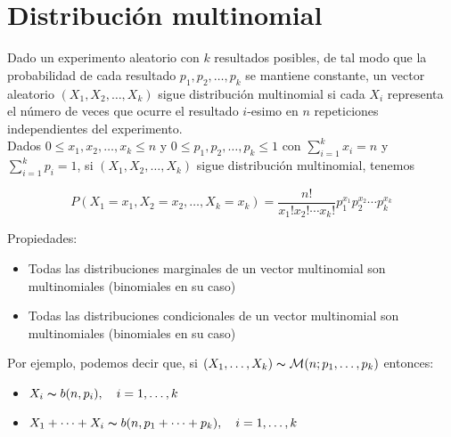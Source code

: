 \section{Distribución multinomial}


Dado un experimento aleatorio con $k$ resultados posibles, de tal modo que la probabilidad de cada resultado $p_1, p_2, \dots, p_k$ se mantiene constante,
un vector aleatorio $(X_1, X_2, \dots, X_k)$ sigue distribución multinomial si cada $X_{i}$ representa el número de veces que ocurre el resultado $i$-esimo
en $n$ repeticiones independientes del experimento. \\
Dados $0 \leq x_1, x_2, \dots, x_k \leq n$ y $0 \leq p_1, p_2, \dots, p_k \leq 1$ con $\sum_{i = 1}^{k}x_i = n$ y $\sum_{i = 1}^{k}p_i = 1$, si 
$(X_1, X_2, \dots, X_k)$ sigue distribución multinomial, tenemos

\[ P(X_1 = x_1, X_2 = x_2,\dots,X_k = x_k) = \frac{n!}{x_{1}!x_{2}!\cdots x_{k}!}p_{1}^{x_1}p_{2}^{x_2}\cdots p_{k}^{x_k}\]

Propiedades:
\begin{itemize}
    \item Todas las distribuciones marginales de un vector multinomial son multinomiales (binomiales en su caso)
    \item Todas las distribuciones condicionales de un vector multinomial son multinomiales (binomiales en su caso)
\end{itemize}
Por ejemplo, podemos decir que, si $(X_1,\dots,X_k)\thicksim\mathcal{M}(n;p_1,\dots,p_k)$ entonces:
\begin{itemize}
    \item $X_i\thicksim b(n, p_i),\quad i = 1,\dots,k$
    \item $X_1 + \cdots + X_i\thicksim b(n, p_1 + \cdots + p_k), \quad i = 1, \dots, k$
\end{itemize}
